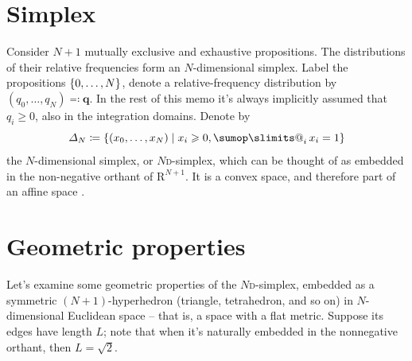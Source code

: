 \documentclass[\ifafour a4paper,12pt,\else a5paper,10pt,\fi%
onecolumn,oneside,article,%
british%
]{memoir}
\makeatletter
\theoremstyle{remark}
\theoremstyle{innote}
\def\sum{\DOTSI\sumop\slimits@}
\newcommand*{\citep}{\parencites}
\newcommand*{\RR}{\bm{\mathrm{R}}}
\newcommand*{\defd}{\coloneqq}
\newcommand*{\defs}{\eqqcolon}
\newcommand*{\suchthat}{\mid}%
\renewcommand*{\ge}{\geqslant}%
\DeclarePairedDelimiter\set{\{}{\}}
\renewcommand*{\|}[1][]{\nonscript\,#1\vert\nonscript\;\mathopen{}}
\newcommand*{\tsum}{\mathop{\textstyle\sum}\nolimits}
\newcommand*{\dd}{\textsc{d}}
\newcommand*{\yq}{\bm{q}}
\newcommand*{\ysim}{\varDelta}
\newcommand*{\yL}{L}
\makeatother
\begin{document}
\section{Simplex}
\label{sec:base}

Consider $N+1$ mutually exclusive and exhaustive propositions. The
distributions of their relative frequencies form an $N$-dimensional
simplex. Label the propositions $\set{0,\dotsc,N}$, denote a
relative-frequency distribution by $(q_0, \dotsc, q_N) \defs \yq$. In the
rest of this memo it's always implicitly assumed that $q_i\ge 0$, also in
the integration domains. Denote by
\begin{equation}
  \label{eq:def_orthant}
  \ysim_N \defd \set{(x_{0},\dotsc,x_{N}) \suchthat x_i\ge 0, \tsum_i x_i = 1}
\end{equation}
the $N$-dimensional simplex, or $N$\dd-simplex, which can be thought of as
embedded in the non-negative orthant of $\RR^{N+1}$. It is a convex space,
and therefore part of an affine space \citep{portamana2011_r2019}.


\section{Geometric properties}
\label{sec:geometry}

Let's examine some geometric properties of the $N$\dd-simplex, embedded as a
symmetric $(N+1)$-hyperhedron (triangle, tetrahedron, and so on) in
$N$-dimensional Euclidean space -- that is, a space with a flat metric.
Suppose its edges have length $\yL$; note that when it's naturally embedded
in the nonnegative orthant, then $\yL=\sqrt{2}$.
\end{document}
